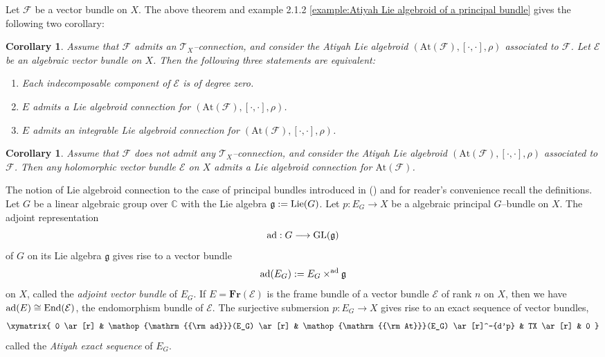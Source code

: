 \documentclass[12pt,reqno]{amsart}
\DeclareMathOperator{\End}{{\rm End}}
\DeclareMathOperator{\Lie}{{\rm Lie}}
\DeclareMathOperator{\At}{{\rm At}}
\DeclareMathOperator{\ad}{{\rm ad}}
\DeclareMathOperator{\GL}{{\rm GL}}
\newcommand{\mf}[1]{\mathfrak{#1}}
\newcommand{\mc}[1]{\mathcal{#1}}
\numberwithin{equation}{subsection}
\newtheorem{corollary}[equation]{Corollary}
\theoremstyle{definition}
\theoremstyle{theorem}
\begin{document}
Let $\mathcal{F}$ be a vector bundle on $X$. The above theorem and example 2.1.2 \eqref{example:Atiyah Lie algebroid of a principal bundle} gives the following two corollary:
\begin{corollary}\cite[Corollary 5.1]{ABKA-2025}
Assume that $\mathcal{F}$ admits an $\mathcal{T}_{X}$--connection, and consider the Atiyah Lie algebroid $(\text{At}(\mathcal{F}), [\cdot,\cdot],\rho)$ associated to $\mathcal{F}$. Let $\mathcal{E}$ be an algebraic vector bundle on $X$. Then the following three statements are equivalent:
\begin{enumerate}
\item Each indecomposable component of $\mathcal{E}$ is of degree zero.
\item $E$ admits a Lie algebroid connection for $(\text{At}(\mathcal{F}),[\cdot,\cdot],\rho)$.
\item $E$ admits an integrable Lie algebroid connection for $(\text{At}(\mathcal{F}),[\cdot,\cdot],\rho)$.
\end{enumerate}
\end{corollary}

\begin{corollary}\cite[Corollary 5.2]{ABKA-2025}
Assume that $\mathcal{F}$ does not admit any $\mathcal{T}_{X}$--connection, and
consider the Atiyah Lie algebroid $(\text{At}(\mathcal{F}), [\cdot,\cdot],\rho)$ associated to $\mathcal{F}$. Then any holomorphic vector bundle $\mathcal{E}$ on $X$ admits a Lie algebroid connection for $\text{At}(\mathcal{F})$.
\end{corollary}




The notion of Lie algebroid connection to the case of principal bundles 
introduced in (\cite{Ghosh-Paul-2025}) and for reader's convenience recall the definitions.
Let $G$ be a linear algebraic group over $\mathbb{C}$ with the Lie algebra $\mf{g} := \Lie(G)$. 
Let $p : E_G \to X$ be a algebraic principal $G$--bundle on $X$. The adjoint representation 
$${\rm ad} : G \longrightarrow \GL(\mf{g})$$ 
of $G$ on its Lie algebra $\mf{g}$ gives rise to a vector bundle 
$$\ad(E_G) := E_G\times^{\rm ad}\mf{g}$$ 
on $X$, called the {\it adjoint vector bundle} of $E_G$. If $E=\textbf{Fr}(\mathcal{E})$ is the frame bundle of a vector bundle $\mc E$ of rank $n$ on $X$, 
then we have $\ad(E) \cong \End(\mc E)$, the endomorphism bundle of $\mc E$. The surjective submersion $p : E_G \to X$ gives rise to an exact sequence of  vector bundles,
\begin{equation}
	\xymatrix{
		0 \ar[r] & \ad(E_G) \ar[r] & \At(E_G) \ar[r]^-{d'p} & TX \ar[r] & 0 
	}
\end{equation}
called the \textit{Atiyah exact sequence} of $E_G$.
\end{document}
